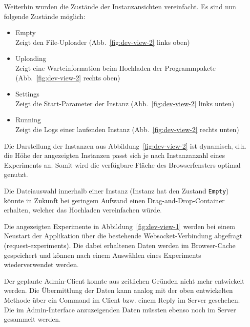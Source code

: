 Weiterhin wurden die Zustände der Instanzansichten vereinfacht. Es sind nun folgende Zustände möglich:
\begin{itemize}
  \item Empty
    \\ Zeigt den File-Uploader
    (Abb.~\ref{fig:dev-view-2} links oben)
  \item Uploading
    \\ Zeigt eine Warteinformation beim Hochladen der Programmpakete
    (Abb.~\ref{fig:dev-view-2} rechts oben)
  \item Settings
    \\ Zeigt die Start-Parameter der Instanz
    (Abb.~\ref{fig:dev-view-2} links unten)
  \item Running
    \\ Zeigt die Logs einer laufenden Instanz
    (Abb.~\ref{fig:dev-view-2} rechts unten)
\end{itemize}
Die Darstellung der Instanzen aus Abbildung~\ref{fig:dev-view-2} ist dynamisch, d.h. die Höhe der angezeigten Instanzen passt sich je nach Instanzanzahl eines Experiments an.
Somit wird die verfügbare Fläche des Browserfensters optimal genutzt.
\par
Die Dateiauswahl innerhalb einer Instanz (Instanz hat den Zustand \texttt{Empty}) könnte in Zukunft bei geringem Aufwand einen Drag-and-Drop-Container erhalten, welcher das Hochladen vereinfachen würde. 
\par Die angezeigten Experimente in Abbildung~\ref{fig:dev-view-1} werden bei einem Neustart der Applikation über die bestehende Websocket-Verbindung abgefragt (request-experiments).
Die dabei erhaltenen Daten werden im Browser-Cache gespeichert und können nach einem Auswählen eines Experiments wiederverwendet werden.
\par
Der geplante Admin-Client konnte aus zeitlichen Gründen nicht mehr entwickelt werden.
Die Übermittlung der Daten kann analog mit der oben entwickelten Methode über ein Command im Client bzw. einem Reply im Server geschehen.
Die im Admin-Interface anzuzeigenden Daten müssten ebenso noch im Server gesammelt werden.
\clearpage
